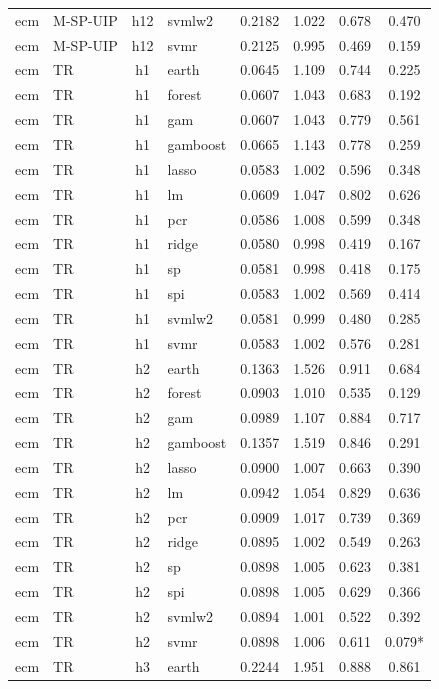 \begin{ThreePartTable}
\begin{longtable}[t]{llclcccc}
ecm & M-SP-UIP & h12 & svmlw2 & 0.2182 & 1.022 & 0.678 & 0.470\\
ecm & M-SP-UIP & h12 & svmr & 0.2125 & 0.995 & 0.469 & 0.159\\
\addlinespace
ecm & TR & h1 & earth & 0.0645 & 1.109 & 0.744 & 0.225\\
ecm & TR & h1 & forest & 0.0607 & 1.043 & 0.683 & 0.192\\
ecm & TR & h1 & gam & 0.0607 & 1.043 & 0.779 & 0.561\\
ecm & TR & h1 & gamboost & 0.0665 & 1.143 & 0.778 & 0.259\\
ecm & TR & h1 & lasso & 0.0583 & 1.002 & 0.596 & 0.348\\
ecm & TR & h1 & lm & 0.0609 & 1.047 & 0.802 & 0.626\\
ecm & TR & h1 & pcr & 0.0586 & 1.008 & 0.599 & 0.348\\
ecm & TR & h1 & ridge & 0.0580 & 0.998 & 0.419 & 0.167\\
ecm & TR & h1 & sp & 0.0581 & 0.998 & 0.418 & 0.175\\
ecm & TR & h1 & spi & 0.0583 & 1.002 & 0.569 & 0.414\\
ecm & TR & h1 & svmlw2 & 0.0581 & 0.999 & 0.480 & 0.285\\
ecm & TR & h1 & svmr & 0.0583 & 1.002 & 0.576 & 0.281\\
\addlinespace
ecm & TR & h2 & earth & 0.1363 & 1.526 & 0.911 & 0.684\\
ecm & TR & h2 & forest & 0.0903 & 1.010 & 0.535 & 0.129\\
ecm & TR & h2 & gam & 0.0989 & 1.107 & 0.884 & 0.717\\
ecm & TR & h2 & gamboost & 0.1357 & 1.519 & 0.846 & 0.291\\
ecm & TR & h2 & lasso & 0.0900 & 1.007 & 0.663 & 0.390\\
ecm & TR & h2 & lm & 0.0942 & 1.054 & 0.829 & 0.636\\
ecm & TR & h2 & pcr & 0.0909 & 1.017 & 0.739 & 0.369\\
ecm & TR & h2 & ridge & 0.0895 & 1.002 & 0.549 & 0.263\\
ecm & TR & h2 & sp & 0.0898 & 1.005 & 0.623 & 0.381\\
ecm & TR & h2 & spi & 0.0898 & 1.005 & 0.629 & 0.366\\
ecm & TR & h2 & svmlw2 & 0.0894 & 1.001 & 0.522 & 0.392\\
ecm & TR & h2 & svmr & 0.0898 & 1.006 & 0.611 & 0.079*\\
\addlinespace
ecm & TR & h3 & earth & 0.2244 & 1.951 & 0.888 & 0.861\\

\end{longtable}
\end{ThreePartTable}
